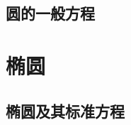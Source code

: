 \begin{Practice}
  \begin{question}
    \item 
    \item 
    \item 
    \item 
    \item 
  \end{question}
\end{Practice}
\subsection{圆的一般方程}
\begin{Practice}
  \begin{question}
    \item 
    \item 
  \end{question}
\end{Practice}
\begin{Exercise}
  \begin{question}
    \item 
    \item 
    \item 
    \item 
    \item 
    \item 
    \item 
    \item 
    \item 
    \item 
    \item 
    \item 
    \item 
    \item 
    \item 
  \end{question}
\end{Exercise}
\section{椭圆}
\subsection{椭圆及其标准方程}
\begin{Practice}
  \begin{question}
    \item 
    \item 
    \item 
  \end{question}
\end{Practice}

